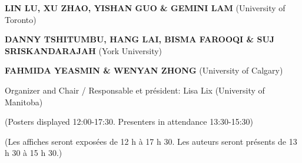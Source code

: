 \def\whenwhere{[Monday May 30 / lundi 30 mai, 12:00]\\}
{%
\medskip\par\textbf{LIN LU, XU ZHAO, YISHAN GUO \& GEMINI LAM} (University of Toronto)
}
\def\whenwhere{[Monday May 30 / lundi 30 mai, 12:00]\\}
{%
\medskip\par\textbf{DANNY TSHITUMBU, HANG LAI, BISMA FAROOQI \& SUJ SRISKANDARAJAH} (York University)
}
\def\whenwhere{[Monday May 30 / lundi 30 mai, 12:00]\\}
{%
\medskip\par\textbf{FAHMIDA YEASMIN \& WENYAN ZHONG} (University of Calgary)
}
\newpage
{}
\begin{center}{\large Organizer and Chair / Responsable et président:  Lisa Lix (University of Manitoba)}
\end{center}
\par (Posters displayed 12:00-17:30. Presenters in attendance 13:30-15:30)\par (Les affiches seront exposées de 12 h à 17 h 30. Les auteurs seront présents de 13 h 30 à 15 h 30.)\vspace{3pt}

